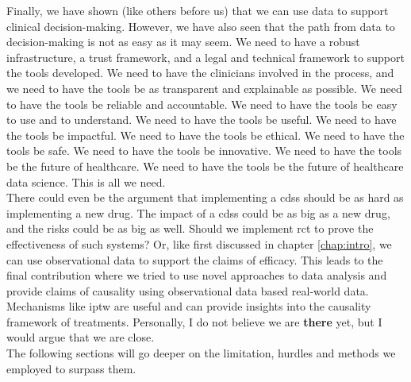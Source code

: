 Finally, we have shown (like others before us) that we can use data to support clinical decision-making. However, we have also seen that the path from data to decision-making is not as easy as it may seem. We need to have a robust infrastructure, a trust framework, and a legal and technical framework to support the tools developed. We need to have the clinicians involved in the process, and we need to have the tools be as transparent and explainable as possible. We need to have the tools be reliable and accountable. We need to have the tools be easy to use and to understand. We need to have the tools be useful. We need to have the tools be impactful. We need to have the tools be ethical. We need to have the tools be safe. We need to have the tools be innovative. We need to have the tools be the future of healthcare. We need to have the tools be the future of healthcare data science. This is all we need. \\

There could even be the argument that implementing a \ac{cdss} should be as hard as implementing a new drug. The impact of a \ac{cdss} could be as big as a new drug, and the risks could be as big as well. Should we implement \ac{rct} to prove the effectiveness of such systems? Or, like first discussed in chapter \ref{chap:intro}, we can use observational data to support the claims of efficacy. This leads to the final contribution where we tried to use novel approaches to data analysis and provide claims of causality using observational data based real-world data. Mechanisms like \ac{iptw} are useful and can provide insights into the causality framework of treatments. Personally, I do not believe we are \textbf{there} yet, but I would argue that we are close.\\
The following sections will go deeper on the limitation, hurdles and methods we employed to surpass them.


